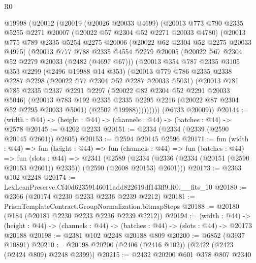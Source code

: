 \begin{lexlean}{R0}
\begin{coremodule}
  @19998
    (@20012
      (@20019
        (@20026 @20033 @4699)
        (@20013
          @773
          @790
          @2335
          @5255
          @2271
          @20007
          (@20022 @57 @2304 @52 @2271 @20033 @4780)
          (@20013
            @775
            @789
            @2335
            @5254
            @2275
            @20006
            (@20022 @62 @2304 @52 @2275 @20033 @4975)
            (@20013
              @777
              @788
              @2335
              @4554
              @2279
              @20005
              (@20022 @67 @2304 @52 @2279 @20033 (@2482 (@4697 @67)))
              (@20013
                @354
                @787
                @2335
                @3105
                @353
                @2299
                (@2496 @19988 @14 @353)
                (@20013
                  @779
                  @786
                  @2335
                  @2338
                  @2287
                  @2298
                  (@20022 @77 @2304 @52 @2287 @20033 @5031)
                  (@20013
                    @781
                    @785
                    @2335
                    @2337
                    @2291
                    @2297
                    (@20022 @82 @2304 @52 @2291 @20033 @5046)
                    (@20013
                      @783
                      @192
                      @2335
                      @2335
                      @2295
                      @2216
                      (@20022 @87 @2304 @52 @2295 @20033 @5061)
                      (@2502 @19988)))))))))
      (@6733 @20009))
@20144 := (width : @44) -> (height : @44) -> (channels : @44) -> (batches : @44) -> @2578
@20145 := @4202 @2233
@20151 := @2334 (@2334 (@2339 (@2590 @20145 @2601)) @2605)
@20153 := @2594 @20145 @2596
@20171 := fun (width : @44) =>
  fun (height : @44) =>
  fun (channels : @44) =>
  fun (batches : @44) =>
  fun (slots : @44) =>
  @2341
    (@2589 (@2334 (@2336 (@2334 (@20151 (@2590 @20153 @2601)) @2335)) (@2590 (@2608 @20153) @2601)))
@20173 := @2363 @102 @2248
@20174 := LexLeanPreserve.Cf40d62359146011add822619df143ff9.R0.__fits_10
@20180 := @2366 (@20174 @2230 @2233 @2236 @2239 @2212)
@20181 := PrismTemplateContract.GroupNormalization.bitmapSteps
@20188 := @20180 (@184 (@20181 @2230 @2233 @2236 @2239 @2212))
@20194 := (width : @44) ->
  (height : @44) -> (channels : @44) -> (batches : @44) -> (slots : @44) -> @20173 @20188
@20198 := @2381 @102 @2248 @20188 @809
@20200 := @6852 (@3937 @10891)
@20210 := @20198 @20200 (@2406 (@2416 @102)) (@2422 (@2423 (@2424 @809) @2248 @2399))
@20215 := @2432 @20200 @601 @378 @807 @2340

\end{coremodule}
\end{lexlean}
